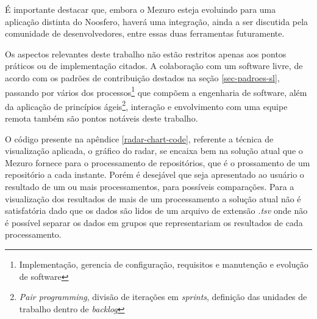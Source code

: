 É importante destacar que, embora o Mezuro esteja evoluindo para uma aplicação distinta do Noosfero, haverá uma integração, ainda a ser discutida pela comunidade de desenvolvedores, entre essas duas ferramentas futuramente.

Os aspectos relevantes deste trabalho não estão restritos apenas aos  pontos práticos ou de implementação citados. A colaboração com um software livre, de acordo com os padrões de contribuição destados na seção \ref{sec-padroes-sl}, passando por vários dos processos\footnote{Implementação, gerencia de configuração, requisitos e manutenção e evolução de software} que compõem a engenharia de software, além da aplicação de princípios ágeis\footnote{\textit{Pair programming}, divisão de iterações em \textit{sprints}, definição das unidades de trabalho dentro de \textit{backlog}}, interação e envolvimento com uma equipe remota também são pontos notáveis deste trabalho.

O código presente na apêndice \ref{radar-chart-code}, referente a técnica de visualização aplicada, o gráfico do radar, se encaixa bem na solução atual que o Mezuro fornece para o processamento de repositórios, que é o prossamento de um repositório a cada instante. Porém é desejável que seja apresentado ao usuário o resultado de um ou mais processamentos, para possíveis comparações. Para a visualização dos resultados de mais de um processamento a solução atual não é satisfatória dado que os dados são lidos de um arquivo de extensão \textit{.tsv} onde não é possível separar os dados em grupos que representariam os resultados de cada processamento.


